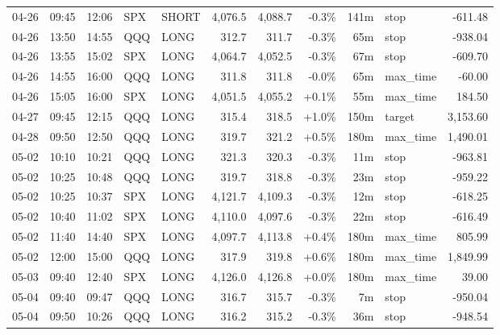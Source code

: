 \documentclass[11pt,a4paper,twoside]{article}
\begin{document}
\begin{center}
\begin{longtable}{>{\color{txtmain}}l l l l l r r r r >{\color{txtmain}}l r}
04-26 & 09:45 & 12:06 & SPX & SHORT & 4,076.5 & 4,088.7 & \textcolor{lossred}{-0.3\%} & 141m & stop & \textcolor{lossred}{-611.48} \\
04-26 & 13:50 & 14:55 & QQQ & LONG & 312.7 & 311.7 & \textcolor{lossred}{-0.3\%} & 65m & stop & \textcolor{lossred}{-938.04} \\
04-26 & 13:55 & 15:02 & SPX & LONG & 4,064.7 & 4,052.5 & \textcolor{lossred}{-0.3\%} & 67m & stop & \textcolor{lossred}{-609.70} \\
04-26 & 14:55 & 16:00 & QQQ & LONG & 311.8 & 311.8 & \textcolor{lossred}{-0.0\%} & 65m & max\_time & \textcolor{lossred}{-60.00} \\
04-26 & 15:05 & 16:00 & SPX & LONG & 4,051.5 & 4,055.2 & \textcolor{wingreen}{+0.1\%} & 55m & max\_time & \textcolor{wingreen}{184.50} \\
04-27 & 09:45 & 12:15 & QQQ & LONG & 315.4 & 318.5 & \textcolor{wingreen}{+1.0\%} & 150m & target & \textcolor{wingreen}{3,153.60} \\
04-28 & 09:50 & 12:50 & QQQ & LONG & 319.7 & 321.2 & \textcolor{wingreen}{+0.5\%} & 180m & max\_time & \textcolor{wingreen}{1,490.01} \\
05-02 & 10:10 & 10:21 & QQQ & LONG & 321.3 & 320.3 & \textcolor{lossred}{-0.3\%} & 11m & stop & \textcolor{lossred}{-963.81} \\
05-02 & 10:25 & 10:48 & QQQ & LONG & 319.7 & 318.8 & \textcolor{lossred}{-0.3\%} & 23m & stop & \textcolor{lossred}{-959.22} \\
05-02 & 10:25 & 10:37 & SPX & LONG & 4,121.7 & 4,109.3 & \textcolor{lossred}{-0.3\%} & 12m & stop & \textcolor{lossred}{-618.25} \\
05-02 & 10:40 & 11:02 & SPX & LONG & 4,110.0 & 4,097.6 & \textcolor{lossred}{-0.3\%} & 22m & stop & \textcolor{lossred}{-616.49} \\
05-02 & 11:40 & 14:40 & SPX & LONG & 4,097.7 & 4,113.8 & \textcolor{wingreen}{+0.4\%} & 180m & max\_time & \textcolor{wingreen}{805.99} \\
05-02 & 12:00 & 15:00 & QQQ & LONG & 317.9 & 319.8 & \textcolor{wingreen}{+0.6\%} & 180m & max\_time & \textcolor{wingreen}{1,849.99} \\
05-03 & 09:40 & 12:40 & SPX & LONG & 4,126.0 & 4,126.8 & \textcolor{wingreen}{+0.0\%} & 180m & max\_time & \textcolor{wingreen}{39.00} \\
05-04 & 09:40 & 09:47 & QQQ & LONG & 316.7 & 315.7 & \textcolor{lossred}{-0.3\%} & 7m & stop & \textcolor{lossred}{-950.04} \\
05-04 & 09:50 & 10:26 & QQQ & LONG & 316.2 & 315.2 & \textcolor{lossred}{-0.3\%} & 36m & stop & \textcolor{lossred}{-948.54} \\

\end{longtable}
\end{center}
\end{document}
